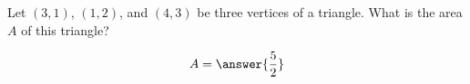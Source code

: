 \documentclass{ximera}
\author{Gregory Hartman \and Matthew Carr}
\begin{document}
\begin{exercise}



Let $(3,1)$, $(1,2)$, and $(4,3)$ be three vertices of a triangle. What is the area $A$ of this triangle?
\begin{prompt}
\[
A=\answer{\frac{5}{2}}
\]
\end{prompt}


\end{exercise}
\end{document}
